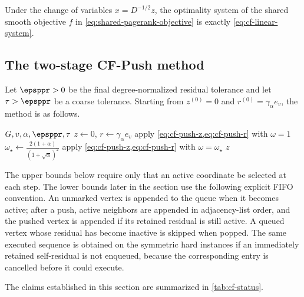 Under the change of variables \(x=D^{-1/2}z\), the optimality system of
the shared smooth objective \(f\) in
\cref{eq:shared-pagerank-objective} is exactly
\cref{eq:cf-linear-system}.

\subsection{The two-stage CF-Push method}
\label{subsec:cf-algorithm}

Let \(\epsppr>0\) be the final degree-normalized residual tolerance and let
\(\tau>\epsppr\) be a coarse tolerance.  Starting from \(z^{(0)}=0\)
and \(r^{(0)}=\gamma_\alpha e_v\), the method is as follows.

\begin{algorithm}[t]
\caption{Two-stage coarse-forward-push/SOR (CF-Push)}
\label{alg:cf-push}
\begin{algorithmic}[1]
\REQUIRE \(G,v,\alpha,\epsppr,\tau\)
\STATE \(z\leftarrow0\), \(r\leftarrow\gamma_\alpha e_v\)
    \STATE apply \cref{eq:cf-push-z,eq:cf-push-r} with \(\omega=1\)
\ENDWHILE
\STATE \(\displaystyle
    \omega_\star\leftarrow
    \frac{2(1+\alpha)}{(1+\sqrt\alpha)^2}\)
    \STATE apply \cref{eq:cf-push-z,eq:cf-push-r} with
           \(\omega=\omega_\star\)
\ENDWHILE
\RETURN \(z\)
\end{algorithmic}
\end{algorithm}

The upper bounds below require only that an active coordinate be selected at
each step.  The lower bounds later in the section use the following explicit
FIFO convention.  An unmarked vertex is appended to the queue when it becomes
active; after a push, active neighbors are appended in adjacency-list order,
and the pushed vertex is appended if its retained residual is still active.
A queued vertex whose residual has become inactive is skipped when popped.
The same executed sequence is obtained on the symmetric hard instances if an
immediately retained self-residual is not enqueued, because the corresponding
entry is cancelled before it could execute.

The claims established in this section are summarized in
\cref{tab:cf-status}.

